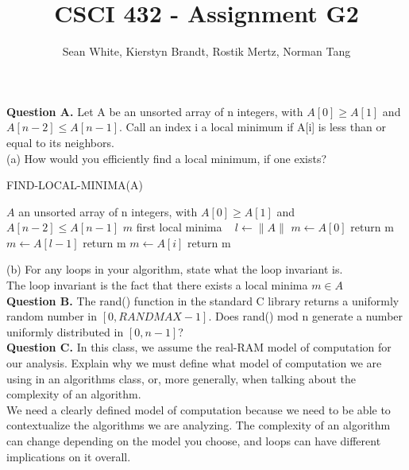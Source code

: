 \documentclass[12pt]{article}
\author{Sean White, Kierstyn Brandt, Rostik Mertz, Norman Tang}
\title{CSCI 432 - Assignment G2}
\begin{document}
\maketitle

\textbf{Question A.} Let A be an unsorted array of n integers, with $A[0] \geq A[1]$ and $A[n - 2] \leq A[n - 1]$. Call an index i a local minimum if A[i] is less than or equal to its neighbors.\\

(a) How would you efficiently find a local minimum, if one exists?\\

\begin{algorithm}[H]\caption{\textsc{FIND-LOCAL-MINIMA(A)}}
	\begin{algorithmic}[1]
		$A$ an unsorted array of n integers, with $A[0] \geq A[1]$ and $A[n - 2] \leq A[n - 1]$
		 $m$ first local minima
		\State ~
		\State $l \gets \|A\|$
			\State $m \gets A[0]$
			\State return m
		\EndIf
			\State $m \gets A[l - 1]$
			\State return m
		\EndIf
				\State $m \gets A[i]$
				\State return m
			\EndIf
		\EndFor
	\end{algorithmic}
\end{algorithm}

(b) For any loops in your algorithm, state what the loop invariant is.\\

The loop invariant is the fact that there exists a local minima $m \in A$\\

\textbf{Question B.} The rand() function in the standard C library returns a uniformly random number in $[0,RANDMAX-1]$. Does rand() mod n generate a number uniformly distributed in $[0, n-1]$?\\

\textbf{Question C.} In this class, we assume the real-RAM model of computation for our analysis. Explain why we must define what model of computation we are using in an algorithms class, or, more generally, when talking about the complexity of an algorithm.\\

We need a clearly defined model of computation because we need to be able to contextualize the algorithms we are analyzing. The complexity of an algorithm can change depending on the model you choose, and loops can have different implications on it overall.\\
\end{document}
